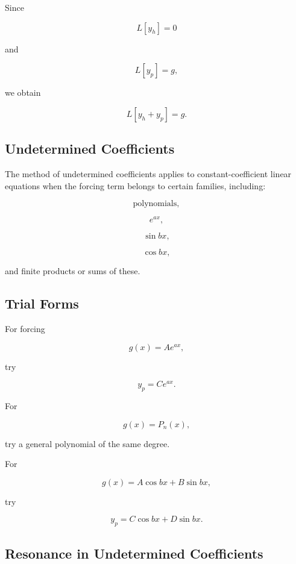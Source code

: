 Since

\[
L[y_h]=0
\]

and

\[
L[y_p]=g,
\]

we obtain

\[
\boxed{
L[y_h+y_p]
=
g.
}
\]

\subsection{Undetermined Coefficients}
\label{subsec:undetermined-coefficients}

The method of undetermined coefficients applies to constant-coefficient
linear equations when the forcing term belongs to certain families,
including:

\[
\boxed{
\text{polynomials},
}
\]

\[
\boxed{
e^{ax},
}
\]

\[
\boxed{
\sin bx,
}
\]

\[
\boxed{
\cos bx,
}
\]

and finite products or sums of these.

\subsection{Trial Forms}
\label{subsec:undetermined-coefficient-trials}

For forcing

\[
g(x)=Ae^{ax},
\]

try

\[
\boxed{
y_p=Ce^{ax}.
}
\]

For

\[
g(x)
=
P_n(x),
\]

try a general polynomial of the same degree.

For

\[
g(x)
=
A\cos bx+B\sin bx,
\]

try

\[
\boxed{
y_p
=
C\cos bx
+
D\sin bx.
}
\]

\subsection{Resonance in Undetermined Coefficients}
\label{subsec:undetermined-coefficients-resonance}

